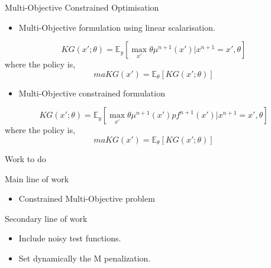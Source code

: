 \documentclass{beamer}
\begin{document}
\begin{frame}{Multi-Objective Constrained Optimisation}

\begin{itemize}
	\item Multi-Objective formulation using linear scalarisation.
\end{itemize}

$$
KG(x';\theta) = \mathbb{E}_{y}[\max_{x'}\theta\mu^{n+1}(x')|x^{n+1}=x',\theta]
$$
where the policy is,
$$
maKG(x') = \mathbb{E}_{\theta}[KG(x';\theta)]
$$

\begin{itemize}
	\item Multi-Objective constrained formulation
\end{itemize}

$$
KG(x';\theta) = \mathbb{E}_{y}[\max_{x'}\theta\mu^{n+1}(x')pf^{n+1}(x')|x^{n+1}=x',\theta]
$$
where the policy is,
$$
maKG(x') = \mathbb{E}_{\theta}[KG(x';\theta)]
$$


\end{frame}

\begin{frame}{Work to do}

Main line of work
\begin{itemize}
	\item Constrained Multi-Objective problem
\end{itemize}

Secondary line of work
\begin{itemize}
	\item Include noisy test functions.
	\item Set dynamically the M penalization.
\end{itemize}
\end{frame}
\end{document}
